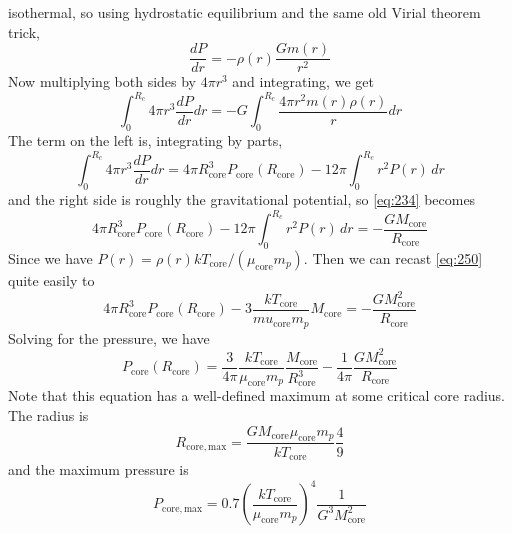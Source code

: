 \documentclass[10pt]{article}
\numberwithin{equation}{section}
\begin{document}
    isothermal, so using hydrostatic equilibrium and the same old
    Virial theorem trick,
    \begin{equation}
      \label{eq:248}
      \frac{dP}{dr}=-\rho(r)\frac{Gm(r)}{r^2}
    \end{equation}
    Now multiplying both sides by $4\pi r^3$ and integrating, we get
    \begin{equation}
      \label{eq:234}
      \int_0^{R_c}4\pi r^3\frac{dP}{dr}dr=-G\int_0^{R_c}\frac{4\pi r^2m(r)\rho(r)}{r}dr
    \end{equation}
    The term on the left is, integrating by parts,
    \begin{equation}
      \label{eq:249}
      \int_0^{R_c}4\pi r^3\frac{dP}{dr}dr=4\pi
      R_{\mathrm{core}}^3P_{\mathrm{core}}(R_{\mathrm{core}})-12\pi\int_0^{R_c}r^2P(r)\,dr
    \end{equation}
    and the right side is roughly the gravitational potential, so
    \eqref{eq:234} becomes
    \begin{equation}
      \label{eq:250}
      4\pi
      R_{\mathrm{core}}^3P_{\mathrm{core}}(R_{\mathrm{core}})-12\pi\int_0^{R_c}r^2P(r)\,dr=-\frac{GM_{\mathrm{core}}}{R_{\mathrm{core}}}
    \end{equation}
    Since we have
    $P(r)=\rho(r)kT_{\mathrm{core}}/(\mu_{\mathrm{core}}m_p)$. Then we
    can recast \eqref{eq:250} quite easily to
    \begin{equation}
      \label{eq:251}
      4\pi R_{\mathrm{core}}^3P_{\mathrm{core}}(R_{\mathrm{core}})-3\frac{kT_{\mathrm{core}}}{mu_{\mathrm{core}}m_p}M_{\mathrm{core}}=-\frac{GM_{\mathrm{core}}^2}{R_{\mathrm{core}}}
    \end{equation}
    Solving for the pressure, we have
    \begin{equation}
      \label{eq:252}
      P_{\mathrm{core}}(R_{\mathrm{core}})=\frac{3}{4\pi}\frac{kT_{\mathrm{core}}}{\mu_{\mathrm{core}}m_p}\frac{M_{\mathrm{core}}}{R_{\mathrm{core}}^3}-\frac{1}{4\pi}\frac{GM_{\mathrm{core}}^2}{R_{\mathrm{core}}}
    \end{equation}
    Note that this equation has a well-defined maximum at some
    critical core radius. The radius is
    \begin{equation}
      \label{eq:253}
      R_{\mathrm{core,
          max}}=\frac{GM_{\mathrm{core}}\mu_{\mathrm{core}}m_p}{k T_{\mathrm{core}}}\frac{4}{9}
    \end{equation}
    and the maximum pressure is
    \begin{equation}
      \label{eq:254}
      P_{\mathrm{core,max}}=0.7\left(\frac{kT_{\mathrm{core}}}{\mu_{\mathrm{core}}m_p}\right)^4\frac{1}{G^3 M_{\mathrm{core}}^2}
    \end{equation}
\end{document}
